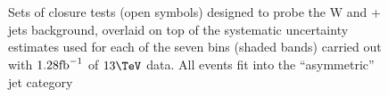 \begin{figure}[h!]
  \begin{center}
     ~~
     \\
     ~~
     \\
    \caption{Sets of closure tests (open symbols) designed to probe
      the W and \ttbar + jets background, overlaid on top of
      the systematic uncertainty estimates used for each of the seven
      \scalht bins (shaded bands) carried out with $1.28\text{fb}^{-1}$ of
      $13\tev$ data. All events fit into the ``asymmetric'' jet
      category}
    \label{fig:ttWclosureDataSym}
  \end{center} 
\end{figure}

